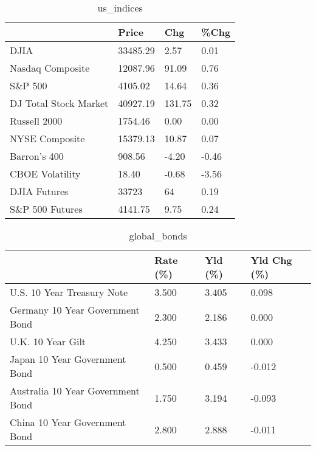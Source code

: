 \documentclass{article}%
\begin{document}
%


\begin{table}[htbp]%
\caption{us\_indices}%
\centering%
\begin{adjustbox}{width=1\textwidth}%
\begin{tabular}{llll}
\toprule
                      &    Price &    Chg &  \%Chg \\
\midrule
                 DJIA & 33485.29 &   2.57 &  0.01 \\
     Nasdaq Composite & 12087.96 &  91.09 &  0.76 \\
              S\&P 500 &  4105.02 &  14.64 &  0.36 \\
DJ Total Stock Market & 40927.19 & 131.75 &  0.32 \\
         Russell 2000 &  1754.46 &   0.00 &  0.00 \\
       NYSE Composite & 15379.13 &  10.87 &  0.07 \\
         Barron's 400 &   908.56 &  -4.20 & -0.46 \\
      CBOE Volatility &    18.40 &  -0.68 & -3.56 \\
         DJIA Futures &    33723 &     64 &  0.19 \\
      S\&P 500 Futures &  4141.75 &   9.75 &  0.24 \\
\bottomrule
\end{tabular}
%
\end{adjustbox}%
\end{table}

%


\begin{table}[htbp]%
\caption{global\_bonds}%
\centering%
\begin{adjustbox}{width=1\textwidth}%
\begin{tabular}{llll}
\toprule
                                  & Rate (\%) & Yld (\%) & Yld Chg (\%) \\
\midrule
       U.S. 10 Year Treasury Note &    3.500 &   3.405 &       0.098 \\
  Germany 10 Year Government Bond &    2.300 &   2.186 &       0.000 \\
                U.K. 10 Year Gilt &    4.250 &   3.433 &       0.000 \\
    Japan 10 Year Government Bond &    0.500 &   0.459 &      -0.012 \\
Australia 10 Year Government Bond &    1.750 &   3.194 &      -0.093 \\
    China 10 Year Government Bond &    2.800 &   2.888 &      -0.011 \\
\bottomrule
\end{tabular}
%
\end{adjustbox}%
\end{table}
\end{document}

